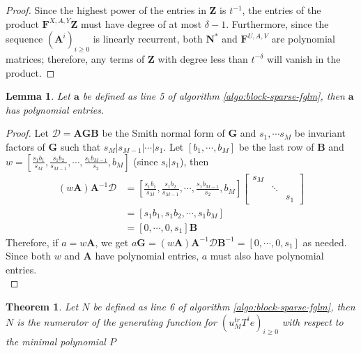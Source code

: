 \documentclass[12pt]{article}
\newtheorem{Lemma}{Lemma}
\newtheorem{theorem}[definition]{Theorem}
\def\mA{\mathbf{A}}
\def\mB{\mathbf{B}}
\def\mF{\mathbf{F}}
\def\mG{\mathbf{G}}
\def\mN{\mathbf{N}}
\def\mZ{\mathbf{Z}}
\begin{document}
\begin{proof}
	Since the highest power of the entries in $\mZ$ is $t^{-1}$, the 
	entries of the product $\mF^{X,A,Y}\mZ$ must have degree of at 
	most $\delta -1$. Furthermore, since the sequence $(\mA^i)_{i \ge 
		0}$ is linearly recurrent, both $\mN^*$ and $\mF^{U,A,V}$ are 
	polynomial matrices;
	therefore, any terms of $\mZ$ with degree less than $t^{-\delta}$
	will vanish in the product.
\end{proof}

\begin{Lemma}\label{utilde}
	Let $\textbf{a}$ be defined as line 5 of algorithm \ref{algo:block-sparse-fglm}, 
	then $\textbf{a}$ has polynomial entries.
\end{Lemma}

\begin{proof}
	Let $\mathscr{D} = \mA\mG\mB$ be the Smith normal form of $\mG$ and $s_1, \cdots s_M$ be
	invariant factors of $\mG$ such that 
	$s_M | s_{M-1} | \cdots | s_1$.
	Let $[b_1,\cdots,b_M]$ be the last row of $\mB$ and 
	$w = [\frac{s_1b_1}{s_M},\frac{s_1b_2}{s_{M-1}},\cdots,\frac{s_1b_{M-1}}{s_2},b_M]$ (since $s_i | s_1$), then
	\begin{align*}
	(w \mA) \mA^{-1} \mathscr{D} &=  [\frac{s_1b_1}{s_M},\frac{s_1b_2}{s_{M-1}},\cdots,\frac{s_1b_{M-1}}{s_2},b_M]
	\begin{bmatrix}
	s_M &        & \\
	& \ddots & \\
	&        & s_1
	\end{bmatrix}\\
	&= [s_1b_1, s_1b_2, \cdots, s_1b_M]\\
	&= [0,\cdots,0,s_1] \mB
	\end{align*}
	Therefore, if $a = w \mA$, we get
	$ a \mG = (w \mA) \mA^{-1} \mathscr{D} \mB^{-1} = 
	[0,\cdots,0,s_1]$ as needed. Since both $w$ and $\mA$ have polynomial
	entries, $a$ must also have polynomial entries.\\
\end{proof}

\begin{theorem}
	 Let $N$ be defined as line 6 of algorithm \ref{algo:block-sparse-fglm}, then $N$ is
	 the numerator of the generating function for 
	 $(u_{M}^{tr} T^i e)_{i \ge 0}$ with respect
	 to the minimal polynomial $P$
\end{theorem}
\end{document}
